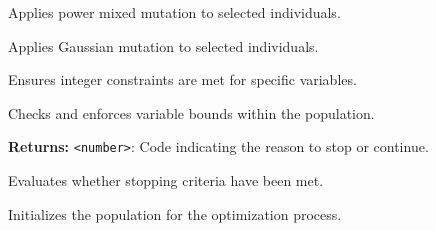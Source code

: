 \documentclass[12pt,a4paper]{article}
\begin{document}
\vspace{5mm}
\noindent {}


\noindent Applies power mixed mutation to selected individuals.

\vspace{5mm}
\noindent {}


\noindent Applies Gaussian mutation to selected individuals.

\vspace{5mm}
\noindent {}


\noindent Ensures integer constraints are met for specific variables.

\vspace{5mm}
\noindent {}


\noindent Checks and enforces variable bounds within the population.

\vspace{5mm}
\noindent {}


\noindent \textbf{Returns:} \texttt{<number>}: Code indicating the reason to stop or continue.

\noindent Evaluates whether stopping criteria have been met.

\vspace{5mm}
\noindent {}


\noindent Initializes the population for the optimization process.

\vspace{5mm}
\noindent {}
\end{document}
